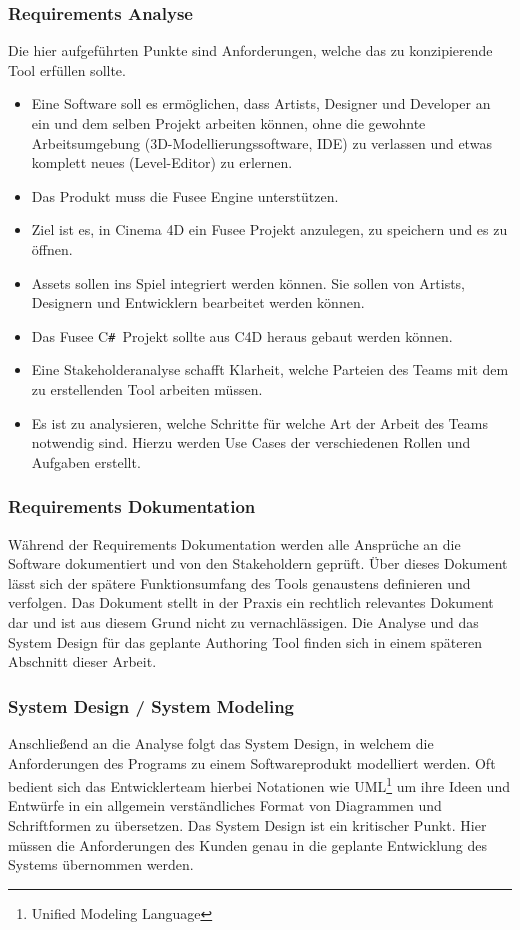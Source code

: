 \documentclass[pagesize, paper=a4, fontsize=12pt, titlepage=true, headings=small, headnosepline, abstractoff, liststotoc, nochapterprefix, plainheadsepline, twoside]{scrreprt}
\newcommand{\CSS}{C\texttt{\# }}
\begin{document}
\subsubsection{Requirements Analyse}
Die hier aufgeführten Punkte sind Anforderungen, welche das zu konzipierende Tool erfüllen sollte.
\begin{itemize}
\item Eine Software soll es ermöglichen, dass Artists, Designer und Developer an ein und dem selben Projekt arbeiten können, ohne die gewohnte Arbeitsumgebung (3D-Modellierungssoftware, IDE) zu verlassen und etwas komplett neues (Level-Editor) zu erlernen.
\item Das Produkt muss die Fusee Engine unterstützen.
\item Ziel ist es, in Cinema 4D ein Fusee Projekt anzulegen, zu speichern und es zu öffnen.
\item Assets sollen ins Spiel integriert werden können. Sie sollen von Artists, Designern und Entwicklern bearbeitet werden können.
\item Das Fusee \CSS Projekt sollte aus C4D heraus gebaut werden können.
\item Eine Stakeholderanalyse schafft Klarheit, welche Parteien des Teams mit dem zu erstellenden Tool arbeiten müssen.
\item Es ist zu analysieren, welche Schritte für welche Art der Arbeit des Teams notwendig sind. Hierzu werden Use Cases der verschiedenen Rollen und Aufgaben erstellt.
\end{itemize}
\subsubsection{Requirements Dokumentation}
Während der Requirements Dokumentation werden alle Ansprüche an die Software dokumentiert und von den Stakeholdern geprüft. Über dieses Dokument lässt sich der spätere Funktionsumfang des Tools genaustens definieren und verfolgen. Das Dokument stellt in der Praxis ein rechtlich relevantes Dokument dar und ist aus diesem Grund nicht zu vernachlässigen. Die Analyse und das System Design für das geplante Authoring Tool finden sich in einem späteren Abschnitt dieser Arbeit.

\subsubsection{System Design / System Modeling}
Anschließend an die Analyse folgt das System Design, in welchem die Anforderungen des Programs zu einem Softwareprodukt modelliert werden. Oft bedient sich das Entwicklerteam hierbei Notationen wie UML\footnote{Unified Modeling Language} um ihre Ideen und Entwürfe in ein allgemein verständliches Format von Diagrammen und Schriftformen zu übersetzen. Das System Design ist ein kritischer Punkt. Hier müssen die Anforderungen des Kunden genau in die geplante Entwicklung des Systems übernommen werden.
\end{document}
